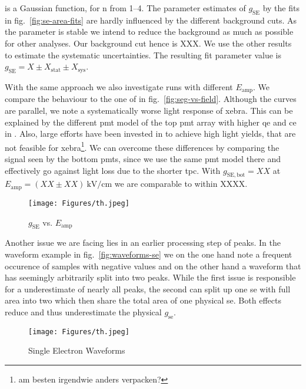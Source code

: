 is a Gaussian function, for n from \numrange{1}{4}.
The parameter estimates of $ g_\mathrm{SE} $ by the fits in fig.~\ref{fig:se-area-fits} are hardly influenced by the different background cuts.
As the parameter is stable we intend to reduce the background as much as possible for other analyses.
Our background cut hence is XXX.  %
We use the other results to estimate the systematic uncertainties.
The resulting fit parameter value is $ g_\mathrm{SE} = X \pm X_\mathrm{stat} \pm X_\mathrm{sys} $.  %


With the same approach we also investigate runs with different $ E_\mathrm{amp} $.
We compare the behaviour to the one of \oneton in fig.~\ref{fig:seg-vs-field}.
Although the curves are parallel, we note a systematically worse light response of \gls{xebra}.
This can be explained by the different \gls{pmt} model of the top \gls{pmt} array with higher \gls{qe} and \gls{ce} in \oneton.
Also, large efforts have been invested in \oneton to achieve high light yields, that are not feasible for \gls{xebra}\footnote{am besten irgendwie anders verpacken?}.
We can overcome these differences by comparing the signal seen by the bottom \gls{pmt}s, since we use the same \gls{pmt} model there and effectively go against light loss due to the shorter \gls{tpc}.
With $ g_\mathrm{SE, bot} = XX $ at $ E_\mathrm{amp} = \left( XX \pm XX \right) \SI{}{\kilo\volt\per\centi\meter} $ we are comparable to \oneton within XXXX.  %


\begin{figure}
    \centering
    \texttt{[image: Figures/th.jpeg]}  %
    \caption[\oneton comparison of Amplification Gain vs. Fieldstrength]{
        $ g_\mathrm{SE} $ vs. $ E_\mathrm{amp} $
    }
\end{figure}
    \label{fig:seg-vs-field}


Another issue we are facing lies in an earlier processing step of peaks.
In the waveform example in fig.~\ref{fig:waveforms-se} we on the one hand note a frequent occurence of samples with negative values and on the other hand a waveform that has seemingly arbitrarily split into two peaks.
While the first issue is responsible for a underestimate of nearly all peaks, the second can split up one \gls{se} with full area into two which then share the total area of one physical \gls{se}.
Both effects reduce and thus underestimate the physical $ g_\mathrm{se} $.


\begin{figure}
    \centering
    \texttt{[image: Figures/th.jpeg]}  %
    \caption[Single Electrons Waveforms]{
        Single Electron Waveforms
    }
\end{figure}


